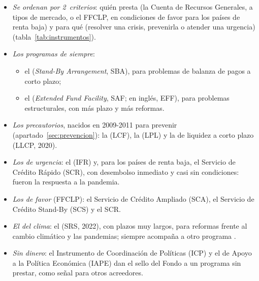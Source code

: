 \documentclass[11pt]{article}
\begin{document}
\begin{itemize}
\item \emph{Se ordenan por 2~criterios}: quién presta (la Cuenta de Recursos Generales, a tipos de mercado, o el FFCLP, en condiciones de favor para los países de renta baja) y para qué (resolver una crisis, prevenirla o atender una urgencia) (tabla~\ref{tab:instrumentos}).
\item \emph{Los programas de siempre}:
  \begin{itemize}
  \item el  (\emph{Stand-By Arrangement}, SBA), para problemas de balanza de pagos a corto plazo;
  \item el  (\emph{Extended Fund Facility}, SAF; en inglés, EFF), para problemas estructurales, con más plazo y más reformas.
  \end{itemize}
\item \emph{Los precautorios}, nacidos en 2009-2011 para prevenir (apartado~\ref{sec:prevencion}): la  (LCF), la  (LPL) y la de liquidez a corto plazo (LLCP, 2020)\nocite{FMI2026Prestamos}.
\item \emph{Los de urgencia}: el  (IFR) y, para los países de renta baja, el Servicio de Crédito Rápido (SCR), con desembolso inmediato y casi sin condiciones: fueron la respuesta a la pandemia.
\item \emph{Los de favor} (FFCLP): el Servicio de Crédito Ampliado (SCA), el Servicio de Crédito Stand-By (SCS) y el SCR.
\item \emph{El del clima}: el  (SRS, 2022), con plazos muy largos, para reformas frente al cambio climático y las pandemias; siempre acompaña a otro programa .
\item \emph{Sin dinero}: el Instrumento de Coordinación de Políticas (ICP) y el de Apoyo a la Política Económica (IAPE) dan el sello del Fondo a un programa sin prestar, como señal para otros acreedores.
\end{itemize}
\end{document}
